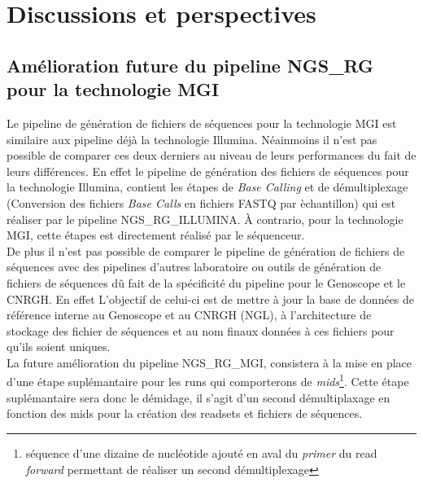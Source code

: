\section{Discussions et perspectives}

\subsection{Amélioration future du pipeline NGS\_RG pour la technologie MGI}
Le pipeline de génération de fichiers de séquences pour la technologie MGI est similaire aux pipeline déjà la technologie Illumina. Néainmoins il n'est pas possible de comparer ces deux derniers au niveau de leurs performances du fait de leurs différences. En effet le pipeline de génération des fichiers de séquences pour la technologie Illumina, contient les étapes de \emph{Base Calling} et de démultiplexage (Conversion des fichiers \emph{Base Calls} en fichiers FASTQ par èchantillon) qui est réaliser par le pipeline NGS\_RG\_ILLUMINA. À contrario, pour la technologie MGI, cette étapes est directement réalisé par le séquenceur.\\
De plus il n'est pas possible de comparer le pipeline de génération de fichiers de séquences avec des pipelines d'autres laboratoire ou outils de génération de fichiers de séquences dû fait de la spécificité du pipeline pour le Genoscope et le CNRGH. En effet L'objectif de celui-ci est de mettre à jour la base de données de référence interne au Genoscope et au CNRGH (NGL), à l'architecture de stockage des fichier de séquences et au nom finaux données à ces fichiers pour qu'ils soient uniques.\\

La future amélioration du pipeline NGS\_RG\_MGI, consistera à la mise en place d'une étape suplémantaire pour les runs qui comporterons de \emph{mids}\footnote{séquence d'une dizaine de nucléotide ajouté en aval du \emph{primer} du read \emph{forward} permettant de réaliser un second démultiplexage}. Cette étape suplémantaire sera donc le démidage, il s'agit d'un second démultiplaxage en fonction des mids pour la création des readsets et fichiers de séquences.
